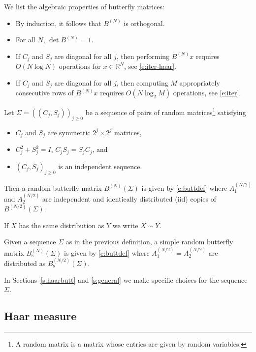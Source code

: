 We list the algebraic properties of butterfly matrices:

\begin{itemize}
\item By induction, it follows that $B^{(N)}$ is orthogonal.
\item For all $N$, $\det B^{(N)} = 1$.
\item If $C_j$ and $S_j$   are diagonal for all $j$, then performing $B^{(N)} x$ requires $O(N \log N)$ operations for $x \in \mathbb R^N$, see \eqref{e:iter-haar}.
\item If $C_j$ and $S_j$ are diagonal for all $j$, then computing $M$ appropriately consecutive rows of $B^{(N)} x $ requires $O(N \log_2 M)$ operations, see \eqref{e:iter}.
\end{itemize}

\begin{definition}
Let $\Sigma = ( (C_j,S_j) )_{j\geq 0}$ be a sequence of pairs of random matrices\footnote{A random matrix is a matrix whose entries are given by random variables.} satisfying
\begin{itemize}
\item $C_{j}$ and $S_{j}$ are symmetric $2^{j}\times 2^{j}$ matrices, \item $C_j^2 + S_{j}^2 = I$, $C_jS_j = S_jC_j$, and \item $(C_j,S_j)_{j \geq 0}$ is an independent sequence.  
\end{itemize}
Then a random butterfly matrix $B^{(N)}(\Sigma)$ is given by \eqref{e:buttdef} where $A_1^{(N/2)}$ and $A_2 ^{(N/2)}$ are independent and identically distributed (iid) copies of $B^{(N/2)}(\Sigma)$. \end{definition}

\begin{notation}
If $X$ has the same distribution as $Y$ we write $X \sim Y$.
\end{notation}

\begin{definition}
Given a sequence $\Sigma$ as in the previous definition, a simple random butterfly matrix $B_\mathrm{s}^{(N)}(\Sigma)$ is given by \eqref{e:buttdef} where $A_1^{(N/2)} = A_2 ^{(N/2)}$ are distributed as $B_\mathrm{s}^{(N/2)}(\Sigma)$.
\end{definition}

In Sections~\ref{s:haarbutt} and \ref{s:general} we make specific choices for the sequence $\Sigma$.

\subsection{Haar measure}

